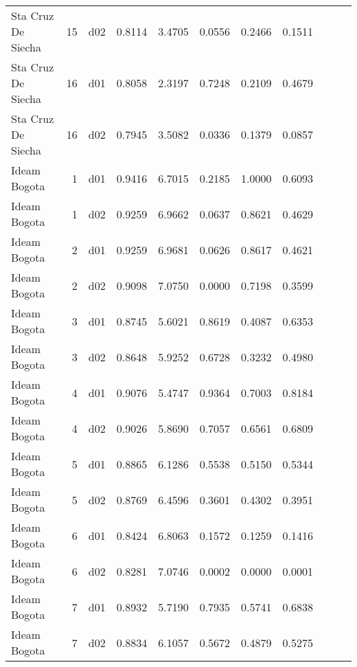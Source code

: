 \begin{landscape}
\begin{longtable}{p{2cm}rrrrrrrrrr}
      Sta Cruz De Siecha  &         15 &     d02 &   0.8114 &  3.4705 &        0.0556 &           0.2466 &  0.1511 \\
      Sta Cruz De Siecha  &         16 &     d01 &   0.8058 &  2.3197 &        0.7248 &           0.2109 &  0.4679 \\
      Sta Cruz De Siecha  &         16 &     d02 &   0.7945 &  3.5082 &        0.0336 &           0.1379 &  0.0857 \\
            Ideam Bogota  &          1 &     d01 &   0.9416 &  6.7015 &        0.2185 &           1.0000 &  0.6093 \\
            Ideam Bogota  &          1 &     d02 &   0.9259 &  6.9662 &        0.0637 &           0.8621 &  0.4629 \\
            Ideam Bogota  &          2 &     d01 &   0.9259 &  6.9681 &        0.0626 &           0.8617 &  0.4621 \\
            Ideam Bogota  &          2 &     d02 &   0.9098 &  7.0750 &        0.0000 &           0.7198 &  0.3599 \\
            Ideam Bogota  &          3 &     d01 &   0.8745 &  5.6021 &        0.8619 &           0.4087 &  0.6353 \\
            Ideam Bogota  &          3 &     d02 &   0.8648 &  5.9252 &        0.6728 &           0.3232 &  0.4980 \\
            Ideam Bogota  &          4 &     d01 &   0.9076 &  5.4747 &        0.9364 &           0.7003 &  0.8184 \\
            Ideam Bogota  &          4 &     d02 &   0.9026 &  5.8690 &        0.7057 &           0.6561 &  0.6809 \\
            Ideam Bogota  &          5 &     d01 &   0.8865 &  6.1286 &        0.5538 &           0.5150 &  0.5344 \\
            Ideam Bogota  &          5 &     d02 &   0.8769 &  6.4596 &        0.3601 &           0.4302 &  0.3951 \\
            Ideam Bogota  &          6 &     d01 &   0.8424 &  6.8063 &        0.1572 &           0.1259 &  0.1416 \\
            Ideam Bogota  &          6 &     d02 &   0.8281 &  7.0746 &        0.0002 &           0.0000 &  0.0001 \\
            Ideam Bogota  &          7 &     d01 &   0.8932 &  5.7190 &        0.7935 &           0.5741 &  0.6838 \\
            Ideam Bogota  &          7 &     d02 &   0.8834 &  6.1057 &        0.5672 &           0.4879 &  0.5275 \\

\end{longtable}
\end{landscape}
